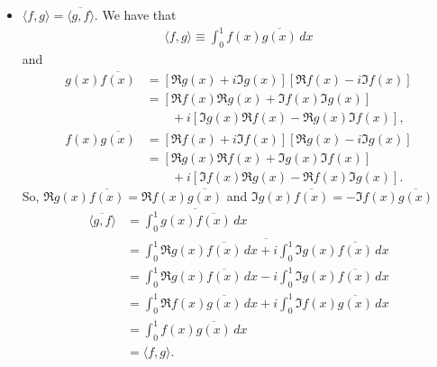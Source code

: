 \documentclass[11pt]{article}
\begin{document}
\begin{enumerate}[(a)]
	\begin{itemize}
		\item $\boxed{\langle f,g \rangle = \overline{\langle g,f\rangle}}$. We have that
		\begin{align*}
		\langle f,g \rangle \equiv \int^1_0 f(x)\overline{g(x)}\,dx
		\end{align*}
		and
		\begin{align*}
		g(x)\overline{f(x)} &= \left[\Re{g(x)} + i\Im{g(x)}\right]\left[\Re{f(x)} - i\Im{f(x)}\right]\\
		&= \left[\Re{f(x)}\Re{g(x)} + \Im{f(x)}\Im{g(x)}\right] \\
		&\qquad + i\left[\Im{g(x)}\Re{f(x)} - \Re{g(x)}\Im{f(x)}\right],
		\end{align*}
		\begin{align*}
		f(x)\overline{g(x)} &= \left[\Re{f(x)} + i\Im{f(x)}\right]\left[\Re{g(x)} - i\Im{g(x)}\right]\\
		&= \left[\Re{g(x)}\Re{f(x)} + \Im{g(x)}\Im{f(x)}\right] \\
		&\qquad + i\left[\Im{f(x)}\Re{g(x)} - \Re{f(x)}\Im{g(x)}\right].
		\end{align*}
		So, $\Re{g(x)\overline{f(x)}} = \Re{f(x)\overline{g(x)}}$ and $\Im{g(x)\overline{f(x)}} = -\Im{f(x)\overline{g(x)}}$
		\begin{align*}
		\overline{\langle g,f \rangle} &= \overline{\int^1_0 g(x)\overline{f(x)}\,dx}\\
		&= \overline{\int^1_0 \Re{g(x)\overline{f(x)}}\,dx + i\int^1_0 \Im{g(x)\overline{f(x)}}\,dx}\\
		&= \int^1_0 \Re{g(x)\overline{f(x)}}\,dx - i\int^1_0 \Im{g(x)\overline{f(x)}}\,dx\\
		&= \int^1_0 \Re{f(x)\overline{g(x)}}\,dx + i\int^1_0 \Im{f(x)\overline{g(x)}}\,dx\\
		&= \int^1_0 f(x)\overline{g(x)}\,dx \\
		&= \langle f,g\rangle.
		\end{align*}
		
		
		
		
		

\end{itemize}
\end{enumerate}
\end{document}

